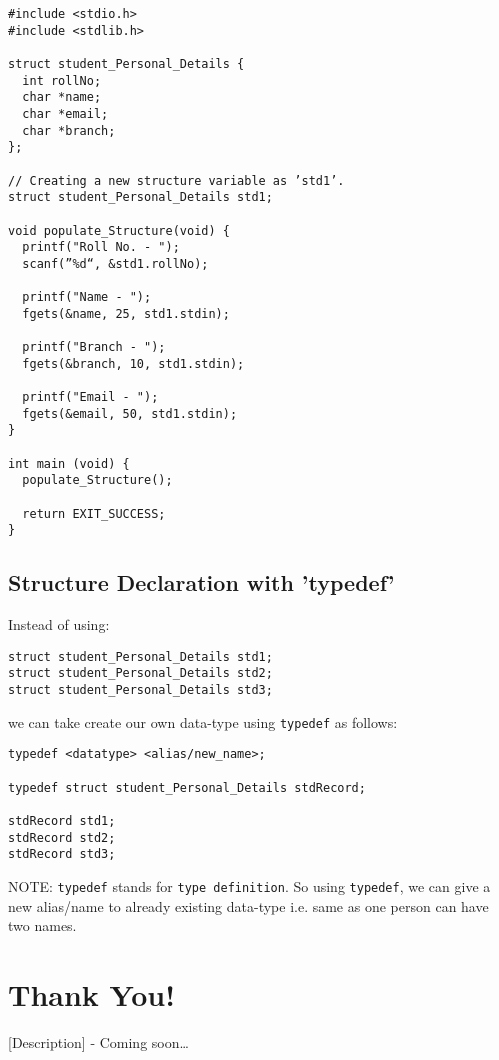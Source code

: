 \documentclass[11pt]{article}
\begin{document}
\begin{verbatim}
#include <stdio.h>
#include <stdlib.h>

struct student_Personal_Details {
  int rollNo;
  char *name;
  char *email;
  char *branch;
};

// Creating a new structure variable as ’std1’.
struct student_Personal_Details std1;

void populate_Structure(void) {
  printf("Roll No. - ");
  scanf(”%d“, &std1.rollNo);

  printf("Name - ");
  fgets(&name, 25, std1.stdin);

  printf("Branch - ");
  fgets(&branch, 10, std1.stdin);

  printf("Email - ");
  fgets(&email, 50, std1.stdin);
}

int main (void) {
  populate_Structure();

  return EXIT_SUCCESS;
}
\end{verbatim}

\subsection{Structure Declaration with ’typedef’}
\label{sec:org7fb368f}

Instead of using:

\begin{verbatim}
struct student_Personal_Details std1;
struct student_Personal_Details std2;
struct student_Personal_Details std3;
\end{verbatim}

we can take create our own data-type using \texttt{typedef} as follows:

\begin{verbatim}
typedef <datatype> <alias/new_name>;

typedef struct student_Personal_Details stdRecord;

stdRecord std1;
stdRecord std2;
stdRecord std3;
\end{verbatim}

NOTE: \texttt{typedef} stands for \texttt{type definition}. So using \texttt{typedef}, we can give a
new alias/name to already existing data-type i.e. same as one person can have
two names.

\section{Thank You!}
\label{sec:org1d11a7e}

[Description] - Coming soon…
\end{document}

